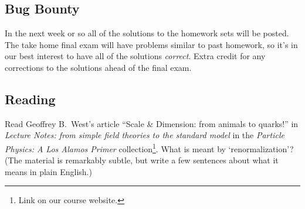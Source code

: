 \documentclass[12pt]{article}
\begin{document}
\subsection{Bug Bounty}

In the next week or so all of the solutions to the homework sets will be posted. The take home final exam will have problems similar to past homework, so it's in our best interest to have all of the solutions \emph{correct}. Extra credit for any corrections to the solutions ahead of the final exam. %

\subsection{Reading}

Read Geoffrey B.\ West's article ``Scale \& Dimension: from animals to quarks!'' in \emph{Lecture Notes: from simple field theories to the standard model} in the \textit{Particle Physics: A Los Alamos Primer} collection\footnote{Link on our course website.}. What is meant by `renormalization'? (The material is remarkably subtle, but write a few sentences about what it means in plain English.)
\end{document}
